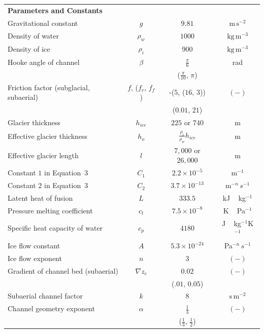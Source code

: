 \documentclass[tc, manuscript]{copernicus}
\begin{document}
\begin{table}[hbt!]
\begin{tabular}{ l  c  c c }
    \textbf{Parameters and Constants}  & & &\\
    Gravitational constant&$g$& $9.81$&$\mathrm{m\,s^{-2}}$\\
    Density of water & $\rho_w$& $1000$ & $\mathrm{kg\,m^{-3}}$ \\
    Density of ice & $\rho_i$& $900$ & $\mathrm{kg\,m^{-3}}$ \\
    Hooke angle of channel & $\beta$ & $\frac{\pi}{6}$ & \unit{rad}\\
         && ($\frac{\pi}{10}$, $\pi$) & \\
    Friction factor (subglacial, subaerial) & $f$, ($f_r$, $f_f$) & -($5$, ($16$, $3$)) & $\mathrm{(-)}$ \\
         && ($0.01$, $21$) & \\
    Glacier thickness &$h_{ice}$& $225$ or $740$  &\unit{m}\\
    Effective glacier thickness &$h_o$&$\frac{\rho_i}{\rho_w} h_{ice}$  &\unit{m}\\
    Effective glacier length &$l$& $7,000$ or $26,000$&\unit{m}\\
    Constant $1$ in Equation~3 &$C_1$&$2.2\times10^{-5}$&\unit{m}$^{-1}$\\
    Constant $2$ in Equation~3 &$C_2$&$3.7\times10^{-13}$&\unit{m}$^{-n}\,s^{-1}$\\
    Latent heat of fusion &$L$&$333.5 $&\unit{kJ\,kg}$^{-1}$\\
    Pressure melting coefficient &$c_t$&$7.5\times 10^{-8}$&\unit{K\,Pa}$^{-1}$\\
    Specific heat capacity of water &$c_p$&$4180$&\unit{J\,kg}$^{-1}$\unit{K}$^{-1}$\\
    Ice flow constant &$A$& $5.3\times10^{-24}$ &\unit{Pa}$^{-n}$\,$s^{-1}$\\
    Ice flow exponent &$n$& $3$ &$\mathrm{(-)}$\\
    
    Gradient of channel bed (subaerial) &$\nabla z_c$ &$0.02$& $\mathrm{(-)}$\\
         &&($.01$, $0.05$) & \\
    Subaerial channel factor & $k$ &$8$ & $\mathrm{s\,m^{-2}}$\\
    Channel geometry exponent &$\alpha$&$\frac{1}{3}$ &$\mathrm{(-)}$ \\
         &&($\frac{1}{3}$, $\frac{1}{2}$) & \\
    \hline
  \end{tabular}
  \label{table:vpm}
\end{table}
\end{document}
